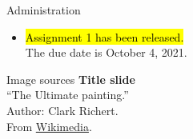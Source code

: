 \documentclass[handout,aspectratio=169]{beamer}
\begin{document}
\backupbegin

\begin{frame}{Administration}
	\begin{itemize}
		\setlength{\itemsep}{0.75cm}
		\item \hl{Assignment 1 has been released.}\\[0.25cm]
		The due date is October 4, 2021.
	\end{itemize}
\end{frame}

\begin{frame}[noframenumbering]{Image sources}
	\small
	\textbf{Title slide}\\\enquote{The Ultimate painting.}\\Author: Clark Richert.\\From \href{https://commons.wikimedia.org/wiki/File:\%22The_Ultimate_painting\%22.jpg}{Wikimedia}.
\end{frame}


\backupend
\end{document}
